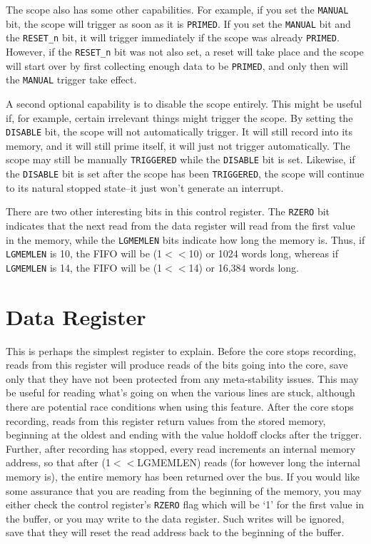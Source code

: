 \documentclass{gqtekspec}
\begin{document}
The scope also has some other capabilities.  For example,
if you set the {\tt MANUAL} bit, the scope will trigger as soon as it is {\tt PRIMED}.
If you set the {\tt MANUAL} bit and the {\tt RESET\_n} bit, it will trigger
immediately if the scope was already {\tt PRIMED}.  However, if the
{\tt RESET\_n} bit was not also set, a reset will take place and the scope
will start over by first collecting enough data to be {\tt PRIMED}, and only
then will the {\tt MANUAL} trigger take effect.

A second optional capability is to disable the scope entirely.  This might be
useful if, for example, certain irrelevant things might trigger the scope.
By setting the {\tt DISABLE} bit, the scope will not automatically trigger.  It
will still record into its memory, and it will still prime itself, it will just
not trigger automatically.  The scope may still be manually {\tt TRIGGERED}
while the {\tt DISABLE} bit is set.  Likewise, if the {\tt DISABLE} bit is set
after the scope has been {\tt TRIGGERED}, the scope will continue to its
natural stopped state--it just won't generate an interrupt.

There are two other interesting bits in this control register.  The {\tt RZERO}
bit indicates that the next read from the data register will read from the first
value in the memory, while the {\tt LGMEMLEN} bits indicate how long the memory is.  Thus, if {\tt LGMEMLEN} is 10, the FIFO will be (1$<<$10) or 1024 words
long, whereas if {\tt LGMEMLEN} is 14, the FIFO will be (1$<<$14) or 16,384 words
long.

\section{Data Register}

This is perhaps the simplest register to explain.  Before the core stops
recording, reads from this register will produce reads of the bits going into
the core, save only that they have not been protected from any meta-stability
issues.  This may be useful for reading what's going on when the various lines
are stuck, although there are potential race conditions when using this feature.
After the core stops recording, reads from this register return values
from the stored memory, beginning at the oldest and ending with the value
holdoff clocks after the trigger.  Further, after recording has stopped, every
read increments an internal memory address, so that after (1$<<$LGMEMLEN)
reads (for however long the internal memory is), the entire memory has been
returned over the bus.
If you would like some assurance that you are reading from the beginning of the
memory, you may either check the control register's {\tt RZERO} flag which will
be `1' for the first value in the buffer, or you may write to the data register.
Such writes will be ignored, save that they will reset the read address back
to the beginning of the buffer.
\end{document}
